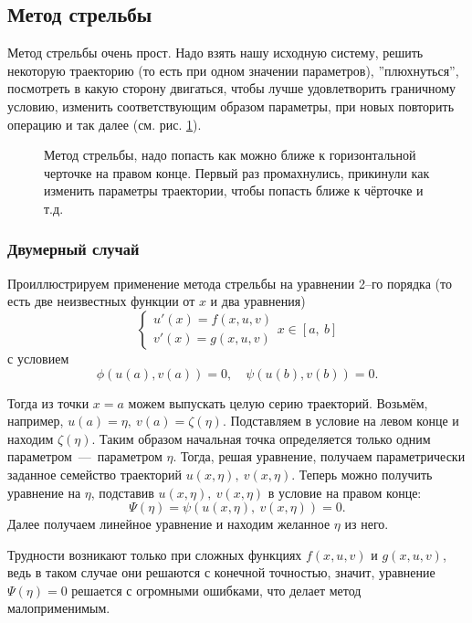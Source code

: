 \documentclass[a4paper,9pt,russian]{article}
\begin{document}
\subsection{Метод стрельбы}
    Метод стрельбы очень прост. {Надо взять нашу исходную систему, решить некоторую траекторию (то есть при одном значении параметров), ''плюхнуться'', посмотреть в какую сторону двигаться, чтобы лучше удовлетворить граничному условию, изменить соответствующим образом параметры, при новых повторить операцию и так далее (см. рис. \ref{graph1})}.
    \begin{figure}[h]
        \noindent{}
        \caption{Метод стрельбы, надо попасть как можно ближе к горизонтальной черточке на правом конце. Первый раз промахнулись, прикинули как изменить параметры траектории, чтобы попасть ближе к чёрточке и т.д.}
        \label{graph1}
    \end{figure} 
\subsubsection{Двумерный случай}
    Проиллюстрируем применение метода стрельбы на уравнении 2--го порядка (то есть две неизвестных функции от $x$ и два уравнения)
    \begin{equation}
    \begin{cases}
        u'(x) = f(x, u,v)\\ v'(x)=g(x,u,v)
    \end{cases}
    x \in [a,\ b]
    \end{equation}
    с условием $$\phi (u(a),v(a)) = 0, \quad \psi(u(b),v(b))=0.$$
    \par
    Тогда из точки $x=a$ можем выпускать целую серию траекторий. Возьмём, например, $u(a)=\eta,\ v(a)=\zeta(\eta)$. Подставляем в условие на левом конце и находим $\zeta(\eta)$. Таким образом начальная точка определяется только одним параметром~---~параметром $\eta$. Тогда, решая уравнение, получаем параметрически заданное семейство траекторий $u(x,\eta),\ v(x,\eta)$. Теперь можно получить уравнение на $\eta$, подставив $u(x,\eta),\ v(x,\eta)$ в условие на правом конце: $$\Psi(\eta) = \psi(u(x,\eta),\ v(x,\eta)) = 0.$$ Далее получаем линейное уравнение и находим желанное $\eta$ из него.
    \par
    Трудности возникают только при сложных функциях $f(x, u,v)$ и $g(x,u,v)$, ведь в таком случае они решаются с конечной точностью, значит, уравнение $\Psi(\eta) = 0$ решается с огромными ошибками, что делает метод малоприменимым.
\end{document}
